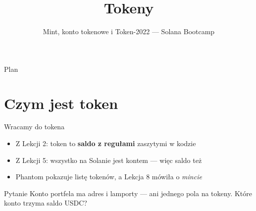 

\usepackage[utf8]{inputenc}
\usepackage[T1]{fontenc}


\title{Tokeny}
\subtitle{Mint, konto tokenowe i Token-2022 --- Solana Bootcamp}
\author{}



\maketitleframe

\begin{frame}{Plan}
  \tableofcontents
\end{frame}

\section{Czym jest token}

\begin{frame}{Wracamy do tokena}
  \begin{itemize}
    \item Z Lekcji 2: token to \textbf{saldo z regułami} zaszytymi w kodzie
    \item Z Lekcji 5: wszystko na Solanie jest kontem --- więc saldo też
    \item Phantom pokazuje listę tokenów, a Lekcja 8 mówiła o \emph{mincie}
  \end{itemize}
  \vspace{0.25cm}
  \begin{alertblock}{Pytanie}
    Konto portfela ma adres i lamporty --- ani jednego pola na tokeny.
    Które konto trzyma saldo USDC?
  \end{alertblock}
\end{frame}

